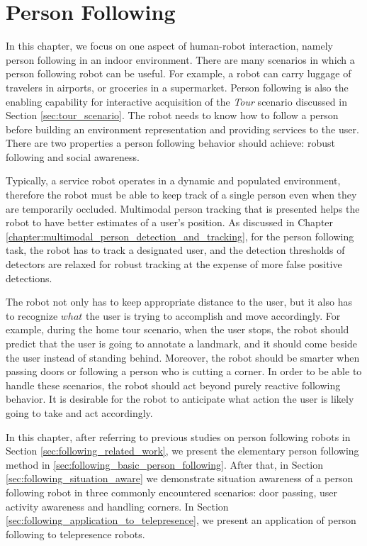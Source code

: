 
\chapter{Person Following}
\label{chapter:person_following}

In this chapter, we focus on one aspect of human-robot interaction, namely person following in an indoor environment. There are many scenarios in which a person following robot can be useful. For example, a robot can carry luggage of travelers in airports, or groceries in a supermarket. Person following is also the enabling capability for interactive acquisition of the \textit{Tour} scenario discussed in Section \ref{sec:tour_scenario}. The robot needs to know how to follow a person before building an environment representation and providing services to the user.  There are two properties a person following behavior should achieve: robust following and social awareness. 

Typically, a service robot operates in a dynamic and populated environment, therefore the robot must be able to keep track of a single person even when they are temporarily occluded. Multimodal person tracking that is presented helps the robot to have better estimates of a user's position. As discussed in Chapter \ref{chapter:multimodal_person_detection_and_tracking}, for the person following task, the robot has to track a designated user, and the detection thresholds of detectors are relaxed for robust tracking at the expense of more false positive detections. 

The robot not only has to keep appropriate distance to the user, but it also has to recognize $what$ the user is trying to accomplish and move accordingly. For example, during the home tour scenario, when the user stops, the robot should predict that the user is going to annotate a landmark, and it should come beside the user instead of standing behind. Moreover, the robot should be smarter when passing doors or following a person who is cutting a corner. In order to be able to handle these scenarios, the robot should act beyond purely reactive following behavior. It is desirable for the robot to anticipate what action the user is likely going to take and act accordingly.

In this chapter, after referring to previous studies on person following robots in Section \ref{sec:following_related_work}, we present the elementary person following method in \ref{sec:following_basic_person_following}. After that, in Section \ref{sec:following_situation_aware} we demonstrate situation awareness of a person following robot in three commonly encountered scenarios: door passing, user activity awareness and handling corners. In Section \ref{sec:following_application_to_telepresence}, we present an application of person following to telepresence robots.

